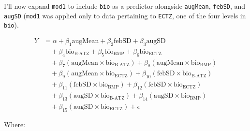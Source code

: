 \documentclass[
  letterpaper,
]{book}
\begin{document}
I'll now expand \texttt{mod1} to include \texttt{bio} as a predictor
alongside \texttt{augMean}, \texttt{febSD}, and \texttt{augSD}
(\texttt{mod1} was applied only to data pertaining to \texttt{ECTZ}, one
of the four levels in \texttt{bio}).

\begin{align}
Y &= \alpha + \beta_1 \text{augMean} + \beta_2 \text{febSD} + \beta_3 \text{augSD} \nonumber \\
  &\quad + \beta_4 \text{bio}_{\text{B-ATZ}} + \beta_5 \text{bio}_{\text{BMP}} + \beta_6 \text{bio}_{\text{ECTZ}} \nonumber \\
  &\quad + \beta_7 (\text{augMean} \times \text{bio}_{\text{B-ATZ}}) + \beta_8 (\text{augMean} \times \text{bio}_{\text{BMP}}) \nonumber \\
  &\quad + \beta_9 (\text{augMean} \times \text{bio}_{\text{ECTZ}}) + \beta_{10} (\text{febSD} \times \text{bio}_{\text{B-ATZ}}) \nonumber \\
  &\quad + \beta_{11} (\text{febSD} \times \text{bio}_{\text{BMP}}) + \beta_{12} (\text{febSD} \times \text{bio}_{\text{ECTZ}}) \nonumber \\
  &\quad + \beta_{13} (\text{augSD} \times \text{bio}_{\text{B-ATZ}}) + \beta_{14} (\text{augSD} \times \text{bio}_{\text{BMP}}) \nonumber \\
  &\quad + \beta_{15} (\text{augSD} \times \text{bio}_{\text{ECTZ}}) + \epsilon \label{mod3}
\end{align}

Where:
\end{document}
